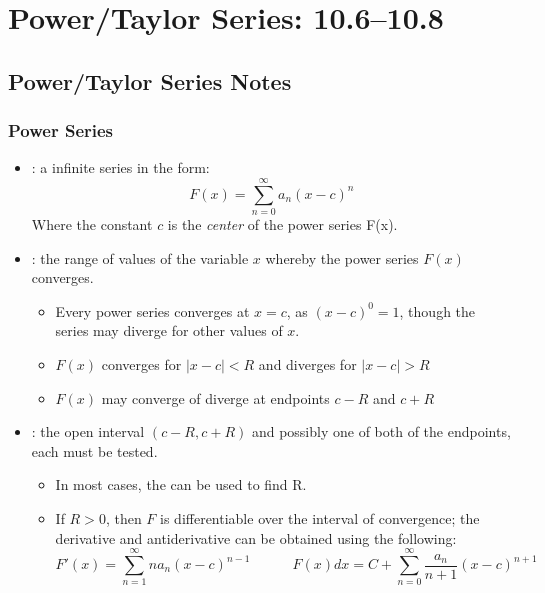 \chapter{Power/Taylor Series: 10.6--10.8}

\section{Power/Taylor Series Notes}

\subsection{Power Series}
\begin{itemize}
  \item {}: a infinite series in the form:
    \[%
    F(x) = \sum_{n=0}^{\infty} a_n (x - c)^n
    \]%
    Where the constant \(c\) is the \textit{center} of the power series F(x).

  \item {}: the range of values of the variable \(x\)
    whereby the power series \(F(x)\) converges.
    \begin{itemize}
      \item Every power series converges at \(x = c\), as \((x-c)^0 = 1\),
        though the series may diverge for other values of \(x\).

      \item \(F(x)\) converges for \(\left| x - c \right| < R \) and diverges
        for \(\left| x - c \right| > R \)

      \item \(F(x)\) may converge of diverge at endpoints \(c-R\) and \(c+R\)

    \end{itemize}

  \item {}: the open interval \((c-R, c+R)\) and
    possibly one of both of the endpoints, each must be tested.
    \begin{itemize}
      \item In most cases, the  can be used to find R.

      \item If \(R > 0\), then \(F\) is differentiable over the interval of
        convergence; the derivative and antiderivative can be obtained
        using the following:
        \[%
          F'(x) = \sum_{n=1}^{\infty} na_n(x-c)^{n-1} \qquad \quad
          F(x)dx = C + \sum_{n=0}^{\infty} \frac{a_n}{n+1}(x-c)^{n+1}
        \]%
    \end{itemize}


\end{itemize}


